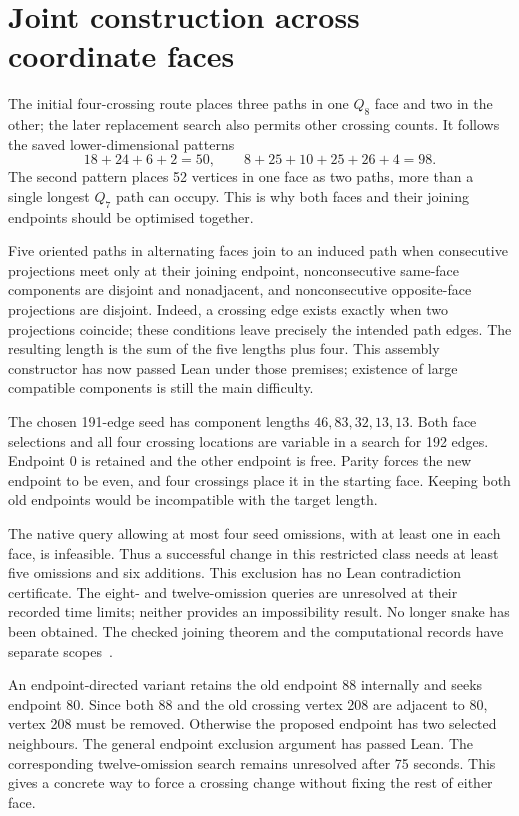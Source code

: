 \documentclass[11pt,a4paper]{article}
\begin{document}
\section{Joint construction across coordinate faces}
The initial four-crossing route places three paths in one $Q_8$ face
and two in the other; the later replacement search also permits other
crossing counts. It follows the saved lower-dimensional patterns
\[
18+24+6+2=50,\qquad 8+25+10+25+26+4=98.
\]
The second pattern places 52 vertices in one face as two paths, more
than a single longest $Q_7$ path can occupy. This is why both faces and
their joining endpoints should be optimised together.

Five oriented paths in alternating faces join to an induced path when
consecutive projections meet only at their joining endpoint,
nonconsecutive same-face components are disjoint and nonadjacent, and
nonconsecutive opposite-face projections are disjoint. Indeed, a crossing
edge exists exactly when two projections coincide; these conditions
leave precisely the intended path edges. The resulting length is the
sum of the five lengths plus four. This assembly constructor has now
passed Lean under those premises; existence of large compatible
components is still the main difficulty.

The chosen 191-edge seed has component lengths $46,83,32,13,13$.
Both face selections and all four crossing locations are variable in a
search for 192 edges. Endpoint 0 is retained and the other endpoint is
free. Parity forces the new endpoint to be even, and four crossings
place it in the starting face. Keeping both old endpoints would be
incompatible with the target length.

The native query allowing at most four seed omissions, with at least
one in each face, is infeasible. Thus a successful change in this
restricted class needs at least five omissions and six additions.
This exclusion has no Lean contradiction certificate. The eight- and
twelve-omission queries are unresolved at their recorded time limits;
neither provides an impossibility result. No longer snake has been
obtained. The checked joining theorem and the computational records
have separate scopes~\cite{research223}.

An endpoint-directed variant retains the old endpoint 88 internally
and seeks endpoint 80. Since both 88 and the old crossing vertex 208
are adjacent to 80, vertex 208 must be removed. Otherwise the proposed
endpoint has two selected neighbours. The general endpoint exclusion
argument has passed Lean. The corresponding twelve-omission search
remains unresolved after 75 seconds. This gives a concrete way to
force a crossing change without fixing the rest of either face.
\end{document}
